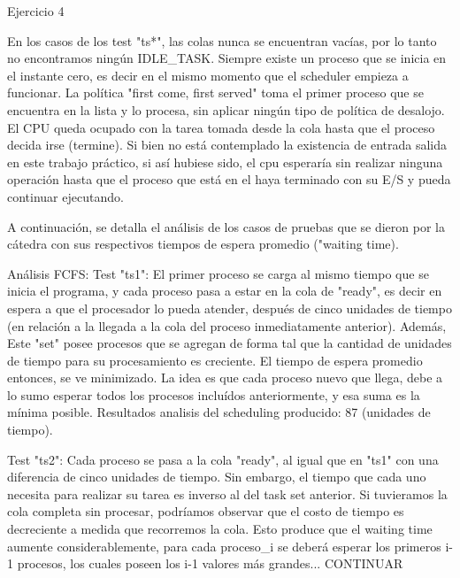 
\begin{section}{Ejercicio 4}

	En los casos de los test "ts*", las colas nunca se encuentran vacías, por lo tanto no encontramos ningún IDLE_TASK. Siempre existe un proceso que se inicia en el instante cero, es decir en el mismo momento que el scheduler empieza a funcionar. La política "first come, first served" toma el primer proceso que se encuentra en la lista y lo procesa, sin aplicar ningún tipo de política de desalojo. El CPU queda ocupado con la tarea tomada desde la cola hasta que el proceso decida irse (termine). Si bien no está contemplado la existencia de entrada salida en este trabajo práctico, si así hubiese sido, el cpu esperaría sin realizar ninguna operación hasta que el proceso que está en el haya terminado con su E/S y pueda continuar ejecutando.

	A continuación, se detalla el análisis de los casos de pruebas que se dieron por la cátedra con sus respectivos tiempos de espera promedio ("waiting time).
	
Análisis FCFS:
	Test "ts1":
		El primer proceso se carga al mismo tiempo que se inicia el programa, y cada proceso pasa a estar en la cola de "ready", es decir en espera a que el procesador lo pueda atender, después de cinco unidades de tiempo (en relación a la llegada a la cola del proceso inmediatamente anterior).
		Además, Este "set" posee procesos que se agregan de forma tal que la cantidad de unidades de tiempo para su procesamiento es creciente. El tiempo de espera promedio entonces, se ve minimizado. La idea es que cada proceso nuevo que llega, debe a lo sumo esperar todos los procesos incluídos anteriormente, y esa suma es la mínima posible.
		Resultados analisis del scheduling producido: 87 (unidades de tiempo).
	
	Test "ts2":
		Cada proceso se pasa a la cola "ready", al igual que en "ts1" con una diferencia de cinco unidades de tiempo. Sin embargo, el tiempo que cada uno necesita para realizar su tarea es inverso al del task set anterior. Si tuvieramos la cola completa sin procesar, podríamos observar que el costo de tiempo es decreciente a medida que recorremos la cola. Esto produce que el waiting time aumente considerablemente, para cada proceso_i se deberá esperar los primeros i-1 procesos, los cuales poseen los i-1 valores más grandes... CONTINUAR
		

\end{section}
